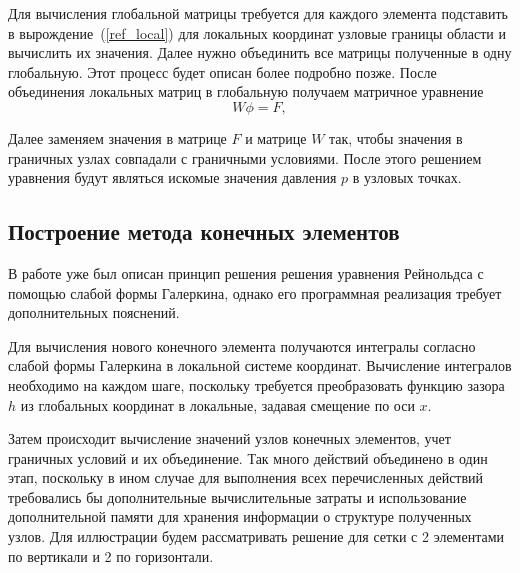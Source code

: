 \documentclass[a4paper,14pt]{extarticle}
\begin{document}
Для вычисления глобальной матрицы требуется для каждого элемента подставить в вырождение~(\ref{ref_local}) для локальных координат узловые границы области и вычислить их значения. 
Далее нужно объединить все матрицы полученные в одну глобальную. Этот процесс будет описан более подробно позже.
После объединения локальных матриц в глобальную получаем матричное уравнение 
\begin{equation*}
	W \phi = F,
\end{equation*}

Далее заменяем значения в матрице $F$ и матрице $W$ так, чтобы значения в граничных узлах совпадали с граничными условиями.
После этого решением уравнения будут являться искомые значения давления $p$ в узловых точках.

\subsection{Построение метода конечных элементов}
В работе уже был описан принцип решения решения уравнения Рейнольдса с помощью слабой формы Галеркина, однако его программная реализация требует дополнительных пояснений.

Для вычисления нового конечного элемента получаются интегралы согласно слабой формы Галеркина в локальной системе координат. Вычисление интегралов необходимо на каждом шаге, поскольку требуется преобразовать функцию зазора $h$ из глобальных координат в локальные, задавая смещение по оси $x$.

Затем происходит вычисление значений узлов конечных элементов, учет граничных условий и их объединение. Так много действий объединено в один этап, поскольку в ином случае для выполнения всех перечисленных действий требовались бы дополнительные вычислительные затраты и использование дополнительной памяти для хранения информации о структуре полученных узлов. Для иллюстрации будем рассматривать решение для сетки с 2 элементами по вертикали и 2 по горизонтали.
\end{document}
